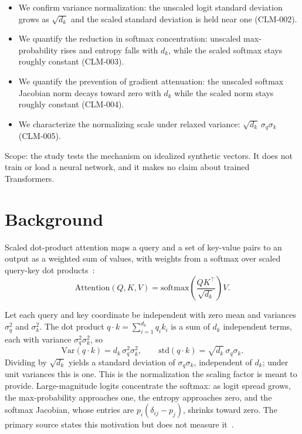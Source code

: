 \documentclass{article}
\begin{document}
\begin{itemize}
  \item We confirm variance normalization: the unscaled logit standard
    deviation grows as $\sqrt{d_k}$ and the scaled standard deviation is held
    near one (CLM-002).
  \item We quantify the reduction in softmax concentration: unscaled max-probability
    rises and entropy falls with $d_k$, while the scaled softmax stays roughly
    constant (CLM-003).
  \item We quantify the prevention of gradient attenuation: the unscaled
    softmax Jacobian norm decays toward zero with $d_k$ while the scaled norm
    stays roughly constant (CLM-004).
  \item We characterize the normalizing scale under relaxed variance:
    $\sqrt{d_k}\,\sigma_q\sigma_k$ (CLM-005).
\end{itemize}

Scope: the study tests the mechanism on idealized synthetic vectors. It does
not train or load a neural network, and it makes no claim about trained
Transformers.

\section{Background}

Scaled dot-product attention maps a query and a set of key-value pairs to an
output as a weighted sum of values, with weights from a softmax over scaled
query-key dot products~\citep{vaswani2017attention}:
\begin{equation}
\mathrm{Attention}(Q, K, V) = \mathrm{softmax}\!\left(\frac{QK^{\top}}{\sqrt{d_k}}\right) V .
\end{equation}

Let each query and key coordinate be independent with zero mean and variances
$\sigma_q^2$ and $\sigma_k^2$. The dot product $q \cdot k = \sum_{i=1}^{d_k}
q_i k_i$ is a sum of $d_k$ independent terms, each with variance
$\sigma_q^2 \sigma_k^2$, so
\begin{equation}
\mathrm{Var}(q \cdot k) = d_k\, \sigma_q^2 \sigma_k^2,
\qquad
\mathrm{std}(q \cdot k) = \sqrt{d_k}\, \sigma_q \sigma_k .
\end{equation}
Dividing by $\sqrt{d_k}$ yields a standard deviation of $\sigma_q\sigma_k$,
independent of $d_k$; under unit variances this is one. This is the
normalization the scaling factor is meant to provide. Large-magnitude logits
concentrate the softmax: as logit spread grows, the max-probability approaches
one, the entropy approaches zero, and the softmax Jacobian, whose entries are
$p_i(\delta_{ij} - p_j)$, shrinks toward zero. The primary source states this
motivation but does not measure it~\citep{vaswani2017attention}.
\end{document}
